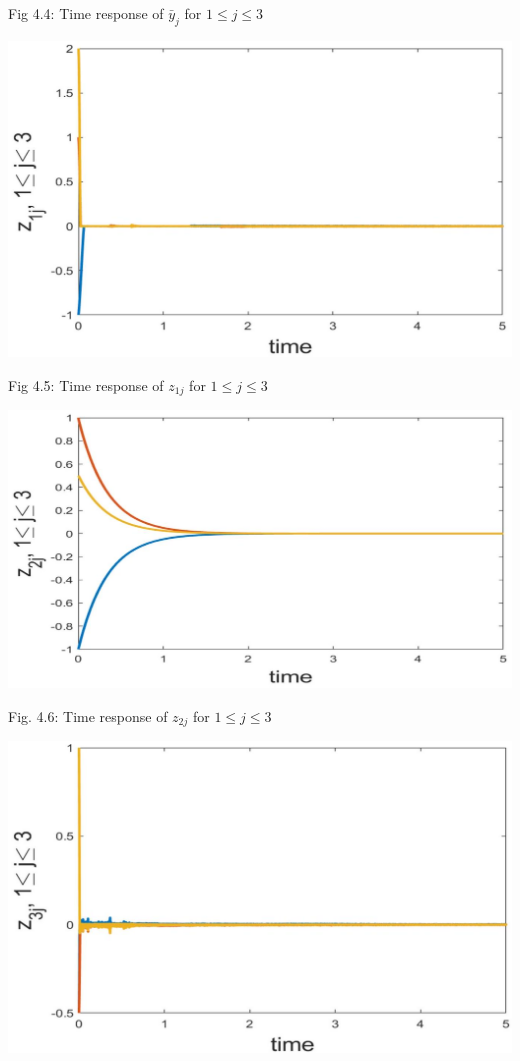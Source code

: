 \documentclass[10pt]{article}
\begin{document}
Fig 4.4: Time response of $\bar{y}_{j}$ for $1 \leq j \leq 3$

\begin{center}
\includegraphics[max width=\textwidth]{2023_10_07_53b70c7408bc8e139415g-68}
\end{center}

Fig 4.5: Time response of $z_{1 j}$ for $1 \leq j \leq 3$

\begin{center}
\includegraphics[max width=\textwidth]{2023_10_07_53b70c7408bc8e139415g-68(1)}
\end{center}

Fig. 4.6: Time response of $z_{2 j}$ for $1 \leq j \leq 3$

\begin{center}
\includegraphics[max width=\textwidth]{2023_10_07_53b70c7408bc8e139415g-69}
\end{center}
\end{document}
